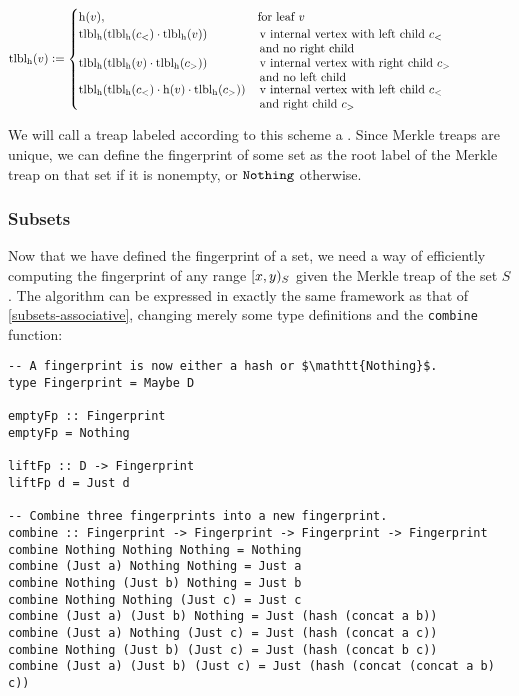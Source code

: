   \[
   \tlabel{\h}(v) \defeq \begin{cases}
\h(v), &  \text{for leaf $v$} \\
\tlabel{\h}(\tlabel{\h}(c_{<}) \concatenate \tlabel{\h}(v)) & \, \parbox[t]{.6\textwidth}{v internal vertex with left child $c_{<}$\\and no right child}\\
\tlabel{\h}(\tlabel{\h}(v) \concatenate \tlabel{\h}(c_{>})) & \, \parbox[t]{.6\textwidth}{v internal vertex with right child $c_{>}$\\and no left child}\\
\tlabel{\h}(\tlabel{\h}(c_{<}) \concatenate \h(v) \concatenate \tlabel{\h}(c_{>})) & \, \parbox[t]{.6\textwidth}{v internal vertex with left child $c_{<}$\\and right child $c_{>}$}
\end{cases}
  \]

We will call a treap labeled according to this scheme a . Since Merkle treaps are unique, we can define the fingerprint of some set as the root label of the Merkle treap on that set if it is nonempty, or $\mathtt{Nothing}$ otherwise.

\subsubsection{Subsets}

Now that we have defined the fingerprint of a set, we need a way of efficiently computing the fingerprint of any range $[{x},{y})_{S}$ given the Merkle treap of the set $S$. The algorithm can be expressed in exactly the same framework as that of \cref{subsets-associative}, changing merely some type definitions and the \texttt{combine} function:

\begin{verbatim}
-- A fingerprint is now either a hash or $\mathtt{Nothing}$.
type Fingerprint = Maybe D

emptyFp :: Fingerprint
emptyFp = Nothing

liftFp :: D -> Fingerprint
liftFp d = Just d

-- Combine three fingerprints into a new fingerprint.
combine :: Fingerprint -> Fingerprint -> Fingerprint -> Fingerprint
combine Nothing Nothing Nothing = Nothing
combine (Just a) Nothing Nothing = Just a
combine Nothing (Just b) Nothing = Just b
combine Nothing Nothing (Just c) = Just c
combine (Just a) (Just b) Nothing = Just (hash (concat a b))
combine (Just a) Nothing (Just c) = Just (hash (concat a c))
combine Nothing (Just b) (Just c) = Just (hash (concat b c))
combine (Just a) (Just b) (Just c) = Just (hash (concat (concat a b) c))
\end{verbatim}

